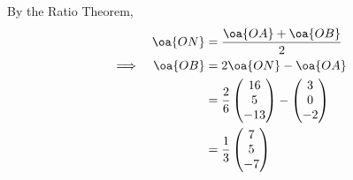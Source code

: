 \documentclass{echw}
\begin{document}

            By the Ratio Theorem,
            \begin{alignat*}{2}
                &&\oa{ON} &= \dfrac{\oa{OA} + \oa{OB}}2\\
                \implies&&\oa{OB} &= 2\oa{ON} - \oa{OA}\\
                && &= \dfrac26\cveciii{16}5{-13} - \cveciii30{-2}\\
                && &= \dfrac13\cveciii75{-7}
            \end{alignat*}

\end{document}
